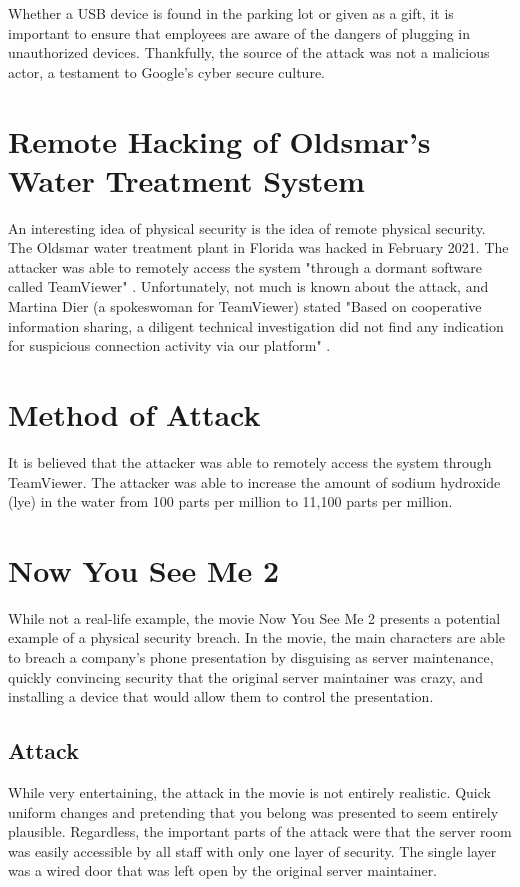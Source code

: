 \documentclass[acmsmall]{acmart}
\begin{document}
Whether a USB device is found in the parking lot or given as a gift, it is important
to ensure that employees are aware of the dangers of plugging in unauthorized devices.
Thankfully, the source of the attack was not a malicious actor, a testament to 
Google's cyber secure culture.

\section{Remote Hacking of Oldsmar's Water Treatment System}
An interesting idea of physical security is the idea of remote physical security.
The Oldsmar water treatment plant in Florida was hacked in February 2021. The
attacker was able to remotely access the system
"through a dormant software called TeamViewer" \cite{CCNFlorida}.
Unfortunately, not much is known about the attack, and Martina Dier (a spokeswoman
for TeamViewer) stated "Based on cooperative information sharing, a diligent technical
investigation did not find any indication for suspicious connection activity via our
platform" \cite{CCNFlorida}.

\section{Method of Attack}
It is believed that the attacker was able to remotely access the system through
TeamViewer. The attacker was able to increase the amount of sodium hydroxide (lye)
in the water from 100 parts per million to 11,100 parts per million.

\section{Now You See Me 2}
While not a real-life example, the movie Now You See Me 2 \cite{NowYouSeeMe2} presents
a potential example of a physical security breach. In the movie, the main characters
are able to breach a company's phone presentation by disguising as server maintenance,
quickly convincing security that the original server maintainer was crazy, and
installing a device that would allow them to control the presentation.

\subsection{Attack}
While very entertaining, the attack in the movie is not entirely realistic. Quick uniform
changes and pretending that you belong was presented to seem entirely plausible. Regardless,
the important parts of the attack were that the server room was easily accessible by all staff
with only one layer of security. The single layer was a wired door that was left open
by the original server maintainer.
\end{document}
